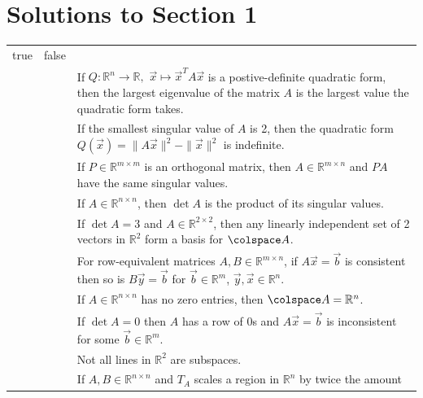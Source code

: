 
\section{Solutions to Section 1}
	\begin{table}[!h]
		\centering
		\begin{tabular}{c@{\hspace{2.5em}}cp{}}
			true & false & \\
			\specialrule{\lightrulewidth}{0.25em}{1.25em}
			\bubble & \dbubble & If \(Q \colon \mathbb{R}^n \to \mathbb{R},\) \(\vec{x} \mapsto \vec{x}^TA\vec{x}\) is a postive-definite quadratic 
						      form, then the largest eigenvalue of the matrix \(A\) is the largest value the quadratic form takes. \\[0.75em]
			\bubble & \dbubble & If the smallest singular value of \(A\) is 2, then the quadratic form \(Q(\vec{x}) = \|A\vec{x}\|^2 - \|\vec{x}\|^2\) is
						      indefinite. \\[0.75em]
			\dbubble & \bubble & If \(P \in \mathbb{R}^{m \times m}\) is an orthogonal matrix, then \(A \in \mathbb{R}^{m \times n}\) and 
						     \(PA\) have the same singular values. \\[0.75em]
			\bubble & \dbubble & If \(A \in \mathbb{R}^{n \times n}\), then \(\det A\) is the product of its singular values. \\[0.75em] 
			\dbubble & \bubble & If \(\det A = 3\) and \(A \in \mathbb{R}^{2 \times 2}\), then any linearly independent set of 2 vectors in 
						      \(\mathbb{R}^2\) form a basis for \(\colspace A\). \\[0.75em]
			\bubble & \dbubble & For row-equivalent matrices \(A, B \in \mathbb{R}^{m \times n}\), if \(A\vec{x} = \vec{b}\) is consistent then so is
						      \(B\vec{y} = \vec{b}\) for \(\vec{b} \in \mathbb{R}^m\), \(\vec{y}, \vec{x} \in \mathbb{R}^n\).\\[0.75em]
			\bubble & \dbubble & If \(A \in \mathbb{R}^{n \times n}\) has no zero entries, then \(\colspace A = \mathbb{R}^n\). \\[0.75em]
			\bubble & \dbubble & If \(\det A = 0\) then \(A\) has a row of 0s and \(A\vec{x} = \vec{b}\) is inconsistent for some 
						      \(\vec{b} \in \mathbb{R}^m\). \\[0.75em]
			\dbubble & \bubble & Not all lines in \(\mathbb{R}^2\) are subspaces. \\[0.75em]
			\bubble & \dbubble & If \(A, B \in \mathbb{R}^{n \times n}\) and \(T_A\) scales a region in \(\mathbb{R}^n\) by twice the amount 

\end{tabular}
\end{table}

